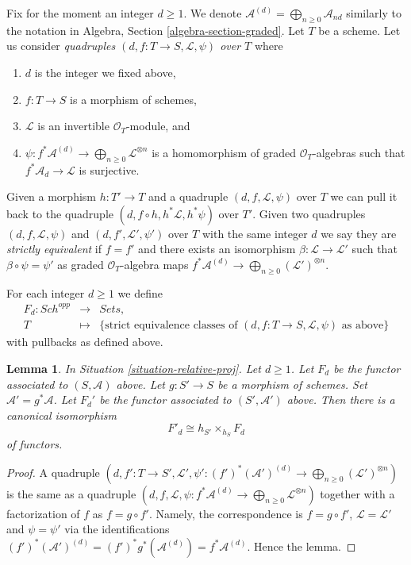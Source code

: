 \documentclass{stacks-project}
\theoremstyle{plain}
\newtheorem{lemma}[subsection]{Lemma}
\theoremstyle{definition}
\theoremstyle{remark}
\numberwithin{equation}{subsection}
\def\Sch{\mathit{Sch}}
\begin{document}
\medskip\noindent
Fix for the moment an integer $d \geq 1$.
We denote $\mathcal{A}^{(d)} = \bigoplus_{n \geq 0} \mathcal{A}_{nd}$
similarly to the notation in Algebra, Section \ref{algebra-section-graded}.
Let $T$ be a scheme.
Let us consider {\it quadruples $(d, f : T \to S, \mathcal{L}, \psi)$
over $T$} where
\begin{enumerate}
\item $d$ is the integer we fixed above,
\item $f : T \to S$ is a morphism of schemes,
\item $\mathcal{L}$ is an invertible $\mathcal{O}_T$-module, and
\item
$\psi : f^*\mathcal{A}^{(d)} \to \bigoplus_{n \geq 0}\mathcal{L}^{\otimes n}$
is a homomorphism of graded $\mathcal{O}_T$-algebras
such that $f^*\mathcal{A}_d \to \mathcal{L}$ is surjective.
\end{enumerate}
Given a morphism $h : T' \to T$ and a quadruple
$(d, f, \mathcal{L}, \psi)$ over $T$ we can pull it back to the
quadruple $(d, f \circ h, h^*\mathcal{L}, h^*\psi)$ over $T'$.
Given two quadruples $(d, f, \mathcal{L}, \psi)$ and
$(d, f', \mathcal{L}', \psi')$ over $T$ with the same integer $d$
we say they are {\it strictly equivalent} if $f = f'$ and there exists
an isomorphism $\beta : \mathcal{L} \to \mathcal{L}'$
such that $\beta \circ \psi = \psi'$ as graded $\mathcal{O}_T$-algebra maps
$f^*\mathcal{A}^{(d)} \to \bigoplus_{n \geq 0} (\mathcal{L}')^{\otimes n}$.

\medskip\noindent
For each integer $d \geq 1$ we define
\begin{eqnarray*}
F_d : \Sch^{opp} & \longrightarrow & \textit{Sets}, \\
T & \longmapsto &
\{\text{strict equivalence classes of }
(d, f : T \to S, \mathcal{L}, \psi)
\text{ as above}\}
\end{eqnarray*}
with pullbacks as defined above.

\begin{lemma}
\label{lemma-proj-base-change}
In Situation \ref{situation-relative-proj}. Let $d \geq 1$.
Let $F_d$ be the functor
associated to $(S, \mathcal{A})$ above.
Let $g : S' \to S$ be a morphism of schemes.
Set $\mathcal{A}' = g^*\mathcal{A}$. Let $F_d'$ be the
functor associated to $(S', \mathcal{A}')$ above.
Then there is a canonical isomorphism
$$
F'_d \cong h_{S'} \times_{h_S} F_d
$$
of functors.
\end{lemma}

\begin{proof}
A quadruple
$(d, f' : T \to S', \mathcal{L}',
\psi' : (f')^*(\mathcal{A}')^{(d)} \to
\bigoplus_{n \geq 0} (\mathcal{L}')^{\otimes n})$
is the same as a quadruple
$(d, f, \mathcal{L},
\psi : f^*\mathcal{A}^{(d)} \to
\bigoplus_{n \geq 0} \mathcal{L}^{\otimes n})$
together with a factorization of $f$ as $f = g \circ f'$. Namely,
the correspondence is $f = g \circ f'$, $\mathcal{L} = \mathcal{L}'$
and $\psi = \psi'$ via the identifications
$(f')^*(\mathcal{A}')^{(d)} = (f')^*g^*(\mathcal{A}^{(d)}) =
f^*\mathcal{A}^{(d)}$. Hence the lemma.
\end{proof}
\end{document}

